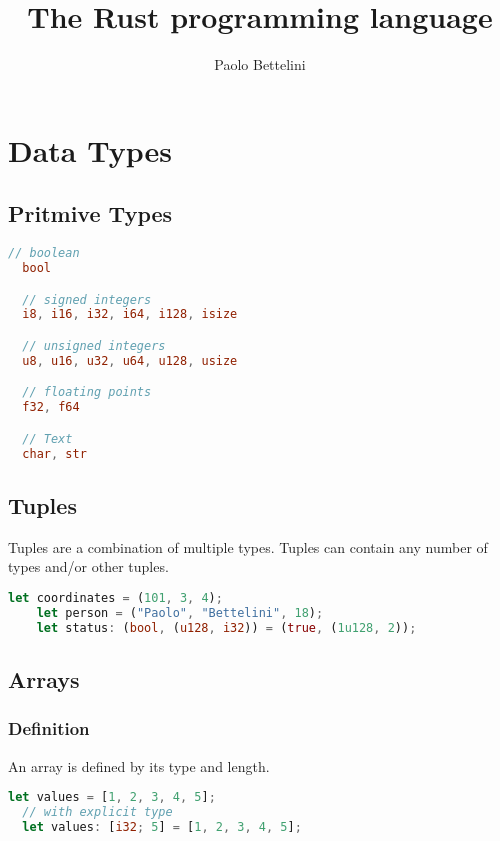 \documentclass{article}
\title{The Rust programming language}
\author{Paolo Bettelini}
\date{}
\begin{document}
\maketitle
\tableofcontents
\pagebreak

\section{Data Types}

\subsection{Pritmive Types}

\begin{lstlisting}[language=Rust, style=boxed, numbers=none]
  // boolean
  bool

  // signed integers
  i8, i16, i32, i64, i128, isize

  // unsigned integers
  u8, u16, u32, u64, u128, usize

  // floating points
  f32, f64

  // Text
  char, str
\end{lstlisting}

\subsection{Tuples}

Tuples are a combination of multiple types.
Tuples can contain any number of types and/or other tuples.

\begin{lstlisting}[language=Rust, style=boxed, numbers=none]
    let coordinates = (101, 3, 4);
    let person = ("Paolo", "Bettelini", 18);
    let status: (bool, (u128, i32)) = (true, (1u128, 2));
\end{lstlisting}

\subsection{Arrays}

\subsubsection{Definition}

An array is defined by its type and length.

\begin{lstlisting}[language=Rust, style=boxed, numbers=none]
  let values = [1, 2, 3, 4, 5];
  // with explicit type
  let values: [i32; 5] = [1, 2, 3, 4, 5];
\end{lstlisting}
\end{document}
